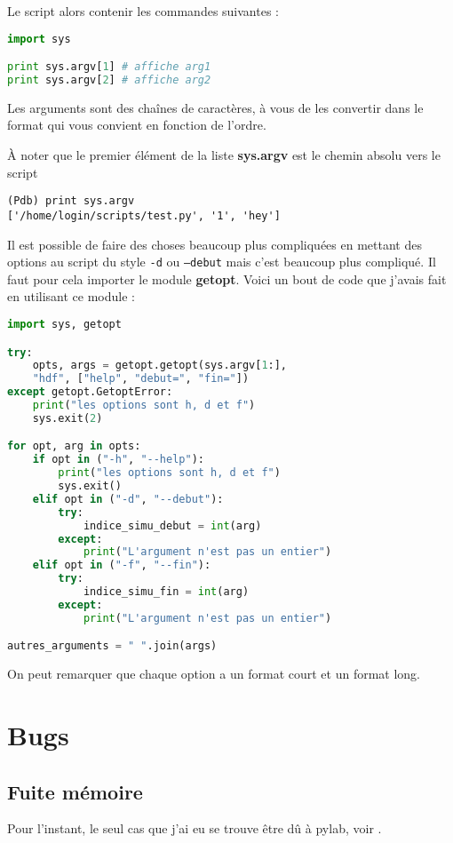 \documentclass[a4paper,twoside]{article}
\begin{document}
Le script alors contenir les commandes suivantes :
\begin{lstlisting}[language=python]
import sys

print sys.argv[1] # affiche arg1
print sys.argv[2] # affiche arg2
\end{lstlisting}
Les arguments sont des chaînes de caractères, à vous de les convertir dans le format qui vous convient en fonction de l'ordre.

\begin{remarque}
À noter que le premier élément de la liste \textbf{sys.argv} est le chemin absolu vers le script
\begin{verbatim}
(Pdb) print sys.argv
['/home/login/scripts/test.py', '1', 'hey']
\end{verbatim}
\end{remarque}

\bigskip

Il est possible de faire des choses beaucoup plus compliquées en mettant des options au script du style \texttt{-d} ou \texttt{--debut} mais c'est beaucoup plus compliqué. Il faut pour cela importer le module \textbf{getopt}. Voici un bout de code que j'avais fait en utilisant ce module : 
\begin{lstlisting}[language=python]
import sys, getopt

try:                                
    opts, args = getopt.getopt(sys.argv[1:], 
    "hdf", ["help", "debut=", "fin="])
except getopt.GetoptError:          
    print("les options sont h, d et f")                        
    sys.exit(2)

for opt, arg in opts:                
    if opt in ("-h", "--help"):      
        print("les options sont h, d et f")                    
        sys.exit()                  
    elif opt in ("-d", "--debut"):
        try:
            indice_simu_debut = int(arg)
        except:
            print("L'argument n'est pas un entier")
    elif opt in ("-f", "--fin"): 
        try:
            indice_simu_fin = int(arg)
        except:
            print("L'argument n'est pas un entier")

autres_arguments = " ".join(args)
\end{lstlisting}
On peut remarquer que chaque option a un format court et un format long.

\section{Bugs}
\subsection{Fuite mémoire}
Pour l'instant, le seul cas que j'ai eu se trouve être dû à pylab, voir .

\printindex
\end{document}
